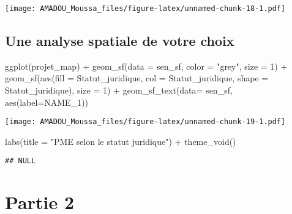 \documentclass[
  14pt,
]{article}
\newenvironment{Shaded}{\begin{snugshade}}{\end{snugshade}}
\newcommand{\AttributeTok}[1]{\textcolor[rgb]{0.77,0.63,0.00}{#1}}
\newcommand{\DecValTok}[1]{\textcolor[rgb]{0.00,0.00,0.81}{#1}}
\newcommand{\FunctionTok}[1]{\textcolor[rgb]{0.00,0.00,0.00}{#1}}
\newcommand{\NormalTok}[1]{#1}
\newcommand{\SpecialCharTok}[1]{\textcolor[rgb]{0.00,0.00,0.00}{#1}}
\newcommand{\StringTok}[1]{\textcolor[rgb]{0.31,0.60,0.02}{#1}}
\begin{document}
\texttt{[image: AMADOU\_Moussa\_files/figure-latex/unnamed-chunk-18-1.pdf]}

\hypertarget{une-analyse-spatiale-de-votre-choix}{%
\subsection{\texorpdfstring{Une analyse spatiale de votre choix\\
}{Une analyse spatiale de votre choix }}\label{une-analyse-spatiale-de-votre-choix}}

\begin{Shaded}
\begin{Highlighting}[]
  \FunctionTok{ggplot}\NormalTok{(projet\_map) }\SpecialCharTok{+}
  \FunctionTok{geom\_sf}\NormalTok{(}\AttributeTok{data =}\NormalTok{ sen\_sf, }\AttributeTok{color =} \StringTok{"grey"}\NormalTok{, }
          \AttributeTok{size =} \DecValTok{1}\NormalTok{) }\SpecialCharTok{+}
  \FunctionTok{geom\_sf}\NormalTok{(}\FunctionTok{aes}\NormalTok{(}\AttributeTok{fill =}\NormalTok{ Statut\_juridique, }
              \AttributeTok{col =}\NormalTok{ Statut\_juridique, }
              \AttributeTok{shape =}\NormalTok{ Statut\_juridique),}
          \AttributeTok{size =} \DecValTok{1}\NormalTok{) }\SpecialCharTok{+}
  \FunctionTok{geom\_sf\_text}\NormalTok{(}\AttributeTok{data=}\NormalTok{ sen\_sf,}
               \FunctionTok{aes}\NormalTok{(}\AttributeTok{label=}\NormalTok{NAME\_1))}
\end{Highlighting}
\end{Shaded}

\texttt{[image: AMADOU\_Moussa\_files/figure-latex/unnamed-chunk-19-1.pdf]}

\begin{Shaded}
\begin{Highlighting}[]
  \FunctionTok{labs}\NormalTok{(}\AttributeTok{title =} \StringTok{"PME selon le statut juridique"}\NormalTok{) }\SpecialCharTok{+}
  \FunctionTok{theme\_void}\NormalTok{() }
\end{Highlighting}
\end{Shaded}

\begin{verbatim}
## NULL
\end{verbatim}

\newpage

\hypertarget{partie-2}{%
\section{\texorpdfstring{\textbf{Partie} 2}{Partie 2}}\label{partie-2}}
\end{document}
